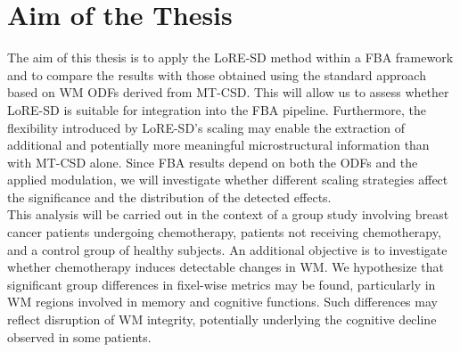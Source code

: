 \section{Aim of the Thesis}

The aim of this thesis is to apply the LoRE-SD method within a FBA framework and to compare the results with those obtained using the standard approach based on WM ODFs derived from MT-CSD. This will allow us to assess whether LoRE-SD is suitable for integration into the FBA pipeline. Furthermore, the flexibility introduced by LoRE-SD's scaling may enable the extraction of additional and potentially more meaningful microstructural information than with MT-CSD alone. Since FBA results depend on both the ODFs and the applied modulation, we will investigate whether different scaling strategies affect the significance and the distribution of the detected effects.
\\This analysis will be carried out in the context of a group study involving breast cancer patients undergoing chemotherapy, patients not receiving chemotherapy, and a control group of healthy subjects. An additional objective is to investigate whether chemotherapy induces detectable changes in WM. We hypothesize that significant group differences in fixel-wise metrics may be found, particularly in WM regions involved in memory and cognitive functions. Such differences may reflect disruption of WM integrity, potentially underlying the cognitive decline observed in some patients.